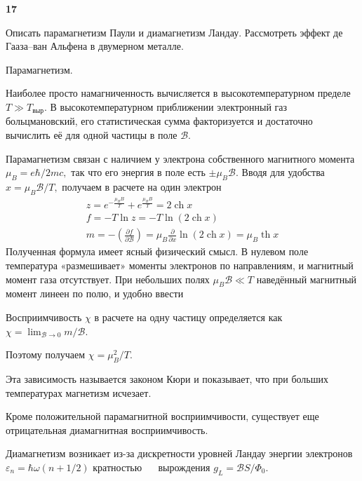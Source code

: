 \documentclass[a4paper,12pt]{article} %
\begin{document}
\begin{ttask} \textbf{17}


Описать парамагнетизм Паули и диамагнетизм Ландау. 
Рассмотреть эффект де Гааза–ван Альфена в двумерном металле. 




Парамагнетизм.


Наиболее просто намагниченность вычисляется в высокотемпературном пределе $T \gg T_{\text {выр}}$. 
В высокотемпературном приближении электронный газ больцмановский, 
его статистическая сумма факторизуется и достаточно вычислить её для одной частицы в поле $\mathcal{B}.$ 

Парамагнетизм связан с наличием у электрона собственного магнитного момента $\mu_{B}=e \hbar / 2 m c,$ 
так что его энергия в поле есть $\pm \mu_{B} \mathcal{B} .$ 
Вводя для удобства $x=\mu_{B} \mathcal{B} / T,$ получаем в расчете на один электрон
$$
\begin{array}{c}
	z=e^{-\frac{\mu_{B} B}{T}}+e^{\frac{\mu_{B} B}{T}}=2 \operatorname{ch} x 
	\\
	f=-T \ln z
	=
	-T \ln (2 \operatorname{ch} x) 
	\\
	m=-\left(\frac{\partial f}{\partial \mathcal{B}}\right)
	=
	\mu_{B} \frac{\partial}{\partial x} \ln (2 \operatorname{ch} x)
	=
	\mu_{B} \operatorname{th} x
\end{array}
$$
Полученная формула  имеет ясный физический смысл. 
В нулевом поле температура «размешивает» моменты электронов по направлениям, 
и магнитный момент газа отсутствует. 
При небольших полях $\mu_{B} \mathcal{B} \ll T$ наведённый магнитный момент линеен по полю, и удобно ввести


Восприимчивость $\chi$ в расчете на одну частицу определяется как 
$\chi=\lim _{\mathcal{B} \rightarrow 0} m / \mathcal{B} .$ 

Поэтому получаем $\chi=\mu_{B}^{2} / T .$

Эта зависимость называется законом Кюри и показывает, что при больших температурах магнетизм исчезает.






Кроме положительной парамагнитной восприимчивости, существует еще 
отрицательная диамагнитная восприимчивость. 

Диамагнетизм возникает из-за дискретности уровней Ландау энергии электронов $\varepsilon_{n}=\hbar \omega(n+1 / 2)$
кратностью $\quad$ вырождения $ g_{L}=\mathcal{B} S / \Phi_{0}$. 


\end{ttask}
\end{document}
